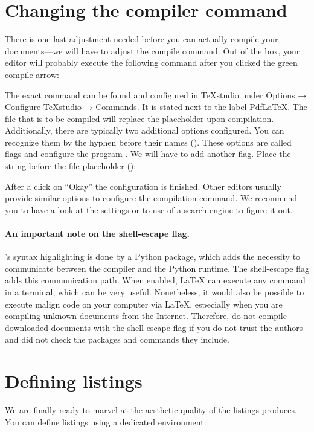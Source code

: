 \section{Changing the compiler command}
There is one last adjustment needed before you can actually compile your documents---we will have to adjust the compile command.
Out of the box, your editor will probably execute the following command after you clicked the green compile arrow:


\noindent The exact command can be found and configured in \TeX{}studio under Options → Configure \TeX{}studio → Commands.
It is stated next to the label Pdf\LaTeX{}.
The file that is to be compiled will replace the placeholder  upon compilation.
Additionally, there are typically two additional options configured.
You can recognize them by the hyphen before their names ().
These options are called flags and configure the program . 
We will have to add another flag.
Place the string  before the file placeholder ():


\noindent After a click on \enquote{Okay} the configuration is finished.
Other editors usually provide similar options to configure the compilation command.
We recommend you to have a look at the settings or to use of a search engine to figure it out.

\paragraph{An important note on the shell-escape flag.} 's syntax highlighting is done by a Python package, which adds the necessity to communicate between the compiler and the Python runtime.
The shell-escape flag adds this communication path.
When enabled, \LaTeX{} can execute any command in a terminal, which can be very useful.
Nonetheless, it would also be possible to execute malign code on your computer via \LaTeX{}, especially when you are compiling unknown documents from the Internet.
Therefore, do not compile downloaded documents with the shell-escape flag if you do not trust the authors and did not check the packages and commands they include.

\section{Defining listings}
We are finally ready to marvel at the aesthetic quality of the listings  produces.
You can define listings using a dedicated environment:

